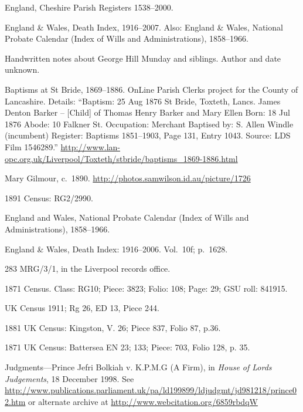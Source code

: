 \begin{thebibliography}{99}
\footnotesize

	England, Cheshire Parish Registers 1538--2000.

	England \& Wales, Death Index, 1916--2007.
	Also: England \& Wales, National Probate Calendar (Index of Wills and Administrations), 1858--1966.

	Handwritten notes about George Hill Munday and siblings. Author and date unknown.

	Baptisms at St Bride, 1869--1886. OnLine Parish Clerks project for the County of Lancashire.
	Details: ``Baptism: 25 Aug 1876 St Bride, Toxteth, Lancs.
	James Denton Barker -- [Child] of Thomas Henry Barker and Mary Ellen
	Born: 18 Jul 1876
	Abode: 10 Falkner St.
	Occupation: Merchant
	Baptised by: S. Allen Windle (incumbent)
	Register: Baptisms 1851--1903, Page 131, Entry 1043.
	Source: LDS Film 1546289.''
	\url{http://www.lan-opc.org.uk/Liverpool/Toxteth/stbride/baptisms_1869-1886.html}

	Mary Gilmour, c.~1890.
	\url{http://photos.samwilson.id.au/picture/1726}

	1891 Census: RG2/2990.

	England and Wales, National Probate Calendar (Index of Wills and Administrations), 1858--1966.

	England \& Wales, Death Index: 1916--2006. Vol.~10f; p.~1628.

	283 MRG/3/1, in the Liverpool records office.

	1871 Census. Class: RG10; Piece: 3823; Folio: 108; Page: 29; GSU roll: 841915.

	UK Census 1911; Rg 26, ED 13, Piece 244.

	1881 UK Census: Kingston, V. 26; Piece 837, Folio 87, p.36.

	1871 UK Census: Battersea EN 23; 133; Piece: 703, Folio 128, p. 35.

	Judgments---Prince Jefri Bolkiah v. K.P.M.G (A Firm), in \emph{House of Lords Judgements}, 18 December 1998.
	See \url{http://www.publications.parliament.uk/pa/ld199899/ldjudgmt/jd981218/prince02.htm}
	or alternate archive at \url{http://www.webcitation.org/6859rbdqW}


\end{thebibliography}
